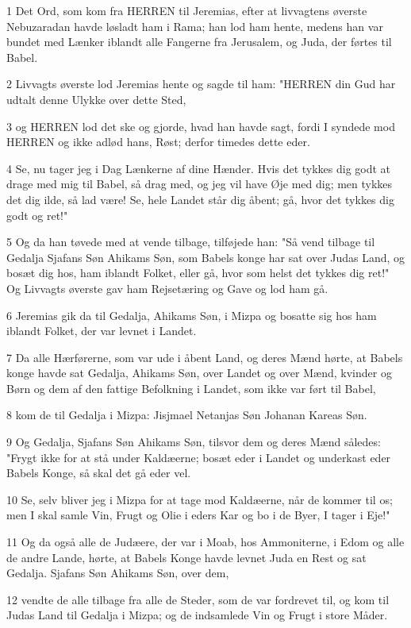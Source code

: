 \par 1 Det Ord, som kom fra HERREN til Jeremias, efter at livvagtens øverste Nebuzaradan havde løsladt ham i Rama; han lod ham hente, medens han var bundet med Lænker iblandt alle Fangerne fra Jerusalem, og Juda, der førtes til Babel.
\par 2 Livvagts øverste lod Jeremias hente og sagde til ham: "HERREN din Gud har udtalt denne Ulykke over dette Sted,
\par 3 og HERREN lod det ske og gjorde, hvad han havde sagt, fordi I syndede mod HERREN og ikke adlød hans, Røst; derfor timedes dette eder.
\par 4 Se, nu tager jeg i Dag Lænkerne af dine Hænder. Hvis det tykkes dig godt at drage med mig til Babel, så drag med, og jeg vil have Øje med dig; men tykkes det dig ilde, så lad være! Se, hele Landet står dig åbent; gå, hvor det tykkes dig godt og ret!"
\par 5 Og da han tøvede med at vende tilbage, tilføjede han: "Så vend tilbage til Gedalja Sjafans Søn Ahikams Søn, som Babels konge har sat over Judas Land, og bosæt dig hos, ham iblandt Folket, eller gå, hvor som helst det tykkes dig ret!" Og Livvagts øverste gav ham Rejsetæring og Gave og lod ham gå.
\par 6 Jeremias gik da til Gedalja, Ahikams Søn, i Mizpa og bosatte sig hos ham iblandt Folket, der var levnet i Landet.
\par 7 Da alle Hærførerne, som var ude i åbent Land, og deres Mænd hørte, at Babels konge havde sat Gedalja, Ahikams Søn, over Landet og over Mænd, kvinder og Børn og dem af den fattige Befolkning i Landet, som ikke var ført til Babel,
\par 8 kom de til Gedalja i Mizpa: Jisjmael Netanjas Søn Johanan Kareas Søn.
\par 9 Og Gedalja, Sjafans Søn Ahikams Søn, tilsvor dem og deres Mænd således: "Frygt ikke for at stå under Kaldæerne; bosæt eder i Landet og underkast eder Babels Konge, så skal det gå eder vel.
\par 10 Se, selv bliver jeg i Mizpa for at tage mod Kaldæerne, når de kommer til os; men I skal samle Vin, Frugt og Olie i eders Kar og bo i de Byer, I tager i Eje!"
\par 11 Og da også alle de Judæere, der var i Moab, hos Ammoniterne, i Edom og alle de andre Lande, hørte, at Babels Konge havde levnet Juda en Rest og sat Gedalja. Sjafans Søn Ahikams Søn, over dem,
\par 12 vendte de alle tilbage fra alle de Steder, som de var fordrevet til, og kom til Judas Land til Gedalja i Mizpa; og de indsamlede Vin og Frugt i store Måder.
